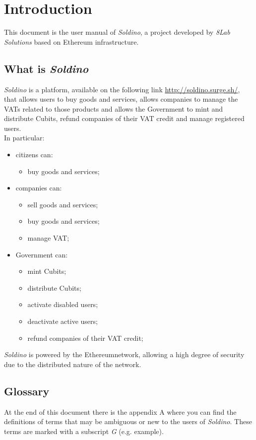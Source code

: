 \section{Introduction} 
This document is the user manual of \textit{Soldino}, a project developed by 
	\textit{8Lab Solutions} based on Ethereum infrastructure. 
	\subsection{What is \textit{Soldino}}
	\textit{Soldino} is a platform, available on the following link \url{http://soldino.surge.sh/}, 
	that allows users to buy goods and services, allows companies to manage the 
	VATs related to those products and allows the Government to mint and 
	distribute Cubits\glo, refund companies of their VAT credit and manage 
	registered users.\\
	In particular:
	\begin{itemize}
		\item citizens can:
		\begin{itemize}
			\item  buy goods and services;
		\end{itemize}
		\item companies can:
		\begin{itemize}
			\item sell goods and services;
			\item buy goods and services;
			\item manage VAT;
		\end{itemize}
		\item Government can:
		\begin{itemize}
			\item mint Cubits\glo;
			\item distribute Cubits\glo;
			\item activate disabled users;
			\item deactivate active users;
			\item refund companies of their VAT credit;
		\end{itemize}
	\end{itemize}
	\textit{Soldino} is powered by the Ethereum\glosp network, allowing a high
	degree of security due to the distributed nature of the network.
	\subsection{Glossary}
	At the end of this document there is the appendix A where you can find 
	the definitions of terms that may be ambiguous or new to the users of 
	\textit{Soldino}. These terms are marked with a subscript \textit{G} 
	(e.g. example\glo).
